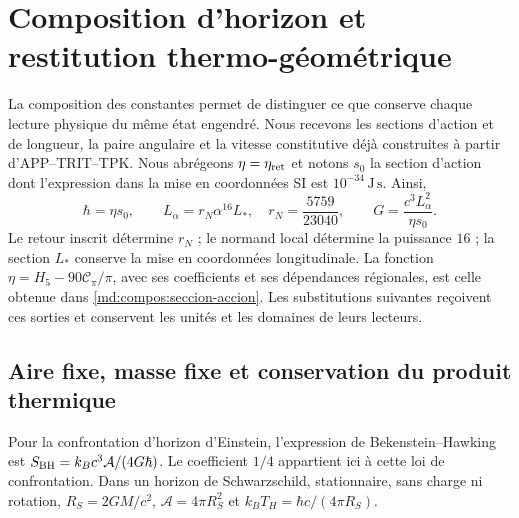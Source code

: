 \section{Composition d’horizon et restitution thermo-géométrique}
\label{ins29:vii:horizonte}

La composition des constantes permet de distinguer ce que conserve chaque
lecture physique du même état engendré. Nous recevons les sections
d’action et de longueur, la paire angulaire et la vitesse constitutive déjà
construites à partir d’APP--TRIT--TPK. Nous abrégeons \(\eta=\eta_{\rm ret}\)
et notons \(s_0\) la section d’action dont l’expression dans la mise en coordonnées
SI est \(10^{-34}\,\mathrm{J\,s}\). Ainsi,
\[
 \hbar=\eta s_0,\qquad
 L_\alpha=r_N\alpha^{16}L_*,\quad r_N=\frac{5759}{23040},\qquad
 G=\frac{c^3L_\alpha^2}{\eta s_0}.
\]
Le retour inscrit détermine \(r_N\) ; le normand local détermine la
puissance \(16\) ; la section \(L_*\) conserve la mise en coordonnées longitudinale.
La fonction \(\eta=H_5-90\mathcal C_\pi/\pi\), avec ses coefficients et ses
dépendances régionales, est celle obtenue dans
\eqref{md:compos:seccion-accion}. Les substitutions suivantes reçoivent ces
sorties et conservent les unités et les domaines de leurs lecteurs.

\subsection{Aire fixe, masse fixe et conservation du produit thermique}

Pour la confrontation d’horizon d’Einstein, l’expression de
Bekenstein--Hawking est
\(S_{\rm BH}=k_Bc^3\mathcal A/(4G\hbar)\).
Le coefficient \(1/4\) appartient ici à cette loi de confrontation.
Dans un horizon de Schwarzschild, stationnaire, sans charge ni rotation,
\(R_S=2GM/c^2\), \(\mathcal A=4\pi R_S^2\) et
\(k_BT_H=\hbar c/(4\pi R_S)\).

